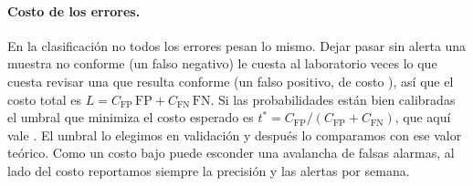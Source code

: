 \paragraph{Costo de los errores.} En la clasificación no todos los errores
pesan lo mismo. Dejar pasar sin alerta una muestra no conforme (un falso
negativo) le cuesta al laboratorio \DatCostoFN{} veces lo que cuesta revisar
una que resulta conforme (un falso positivo, de costo \DatCostoFP{}), así que
el costo total es $L=C_\text{FP}\,\text{FP}+C_\text{FN}\,\text{FN}$. Si las
probabilidades están bien calibradas el umbral que minimiza el costo esperado
es $t^\ast=C_\text{FP}/(C_\text{FP}+C_\text{FN})$, que aquí vale
\ClfUmbralTeorico{}. El umbral lo elegimos en validación y después lo
comparamos con ese valor teórico. Como un costo bajo puede esconder una
avalancha de falsas alarmas, al lado del costo reportamos siempre la
precisión y las alertas por semana.

